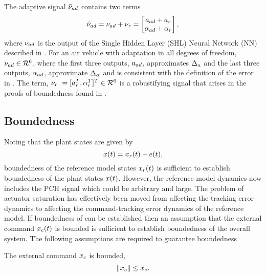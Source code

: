 %
The adaptive signal $\bar{\nu}_{ad}$ contains two terms
\[
\bar{\nu}_{ad} = \nu_{ad} + \nu_r = \begin{bmatrix} a_{ad} + a_r \\
\alpha_{ad} + \alpha_r\end{bmatrix},
\]
where $\nu_{ad}$ is the output of the Single Hidden Layer (SHL) Neural Network (NN) described in
. For an air vehicle with adaptation in all degrees
of freedom, $\nu_{ad} \in \mathcal{R}^{6}$, where the first three outputs,
$a_{ad}$, approximates $\Delta_a$ and the last three outputs, $\alpha_{ad}$,
approximate $\Delta_{\alpha}$ and is consistent with the definition of
the error in .  The term, $\nur\ = [\bfa_r^T, \bfalpha^T_r]^T
\in \real{6}$ is a robustifying signal that arises in the proofs of
boundedness found in \cite{kannan:phd}.



\subsection{Boundedness}
Noting that the plant states are given by
\begin{equation}
\label{e:nrm:plantstates} x(t) = x_r(t) - e(t),
\end{equation}
boundedness of the reference model states $x_r(t)$ is sufficient to establish boundedness of the plant states $x(t)$. However, the reference model dynamics now includes the PCH signal which could be arbitrary and large. The problem of actuator saturation has effectively been moved from affecting the tracking error dynamics to affecting the command-tracking error dynamics of the reference model. If boundedness of  can be established then an assumption that the external command $x_c(t)$ is bounded is sufficient to establish boundedness of the overall system.
The following assumptions are required to guarantee boundedness
\begin{assumption}
\label{ass:kcascade:CommandBounded} The external command $x_c$ is
bounded,
\begin{equation*}
\left\| x_c \right\| \leq \bar{x}_c.
\end{equation*}
\end{assumption}

